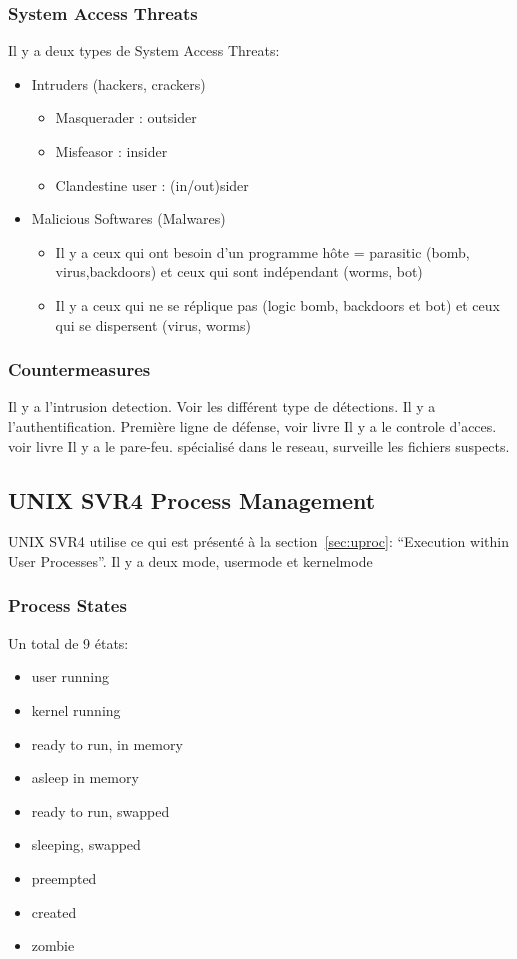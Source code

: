 \subsubsection{System Access Threats}
Il y a deux types de System Access Threats:
\begin{itemize}
  \item Intruders (hackers, crackers)
    \begin{itemize}
      \item Masquerader : outsider
      \item Misfeasor : insider
      \item Clandestine user : (in/out)sider
    \end{itemize}
  \item Malicious Softwares (Malwares)
    \begin{itemize}
      \item Il y a ceux qui ont besoin d'un programme hôte = parasitic (bomb, virus,backdoors) et ceux qui sont indépendant (worms, bot)
      \item Il y a ceux qui ne se réplique pas (logic bomb, backdoors et bot) et ceux qui se dispersent (virus, worms)
    \end{itemize}
\end{itemize}

\subsubsection{Countermeasures}
Il y a l'intrusion detection.
Voir \cite[p.~165]{stallings} les différent type de détections.
Il y a l'authentification.
Première ligne de défense, voir livre Il y a le controle d'acces.
voir livre Il y a le pare-feu.
spécialisé dans le reseau, surveille les fichiers suspects.

\subsection{UNIX SVR4 Process Management}
UNIX SVR4 utilise ce qui est présenté à la section~\ref{sec:uproc}:
``Execution within User Processes''.
Il y a deux mode, usermode et kernelmode

\subsubsection{Process States}
Un total de 9 états:
\begin{itemize}
  \item user running
  \item kernel running
  \item ready to run, in memory
  \item asleep in memory
  \item ready to run, swapped
  \item sleeping, swapped
  \item preempted
  \item created
  \item zombie
\end{itemize}

